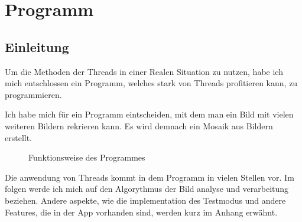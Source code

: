 \section{Programm}
\subsection{Einleitung}
Um die Methoden der Threads in einer Realen Situation zu nutzen, habe ich mich entschlossen ein Programm, welches stark von Threads profitieren kann, zu programmieren.  

Ich habe mich für ein Programm eintscheiden, mit dem man ein Bild mit vielen weiteren Bildern rekrieren kann. Es wird demnach ein Mosaik aus Bildern erstellt.

\begin{figure}[h]
    \centering
    \caption[Programm Funktion]{Funktionsweise des Programmes}
\end{figure}

Die anwendung von Threads kommt in dem Programm in vielen Stellen vor. Im folgen werde ich mich auf den Algorythmus der Bild analyse und verarbeitung beziehen. Andere aspekte, wie die implementation des Testmodus und andere Features, die in der App vorhanden sind, werden kurz im Anhang erwähnt.

\newpage
